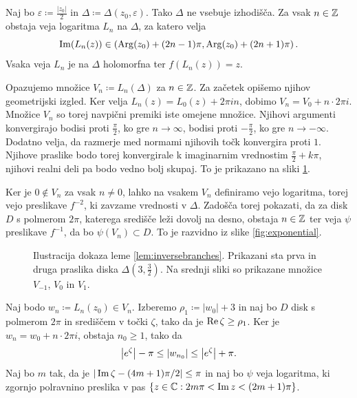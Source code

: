 \begin{dokaz}
    Naj bo \(\varepsilon \coloneq \frac{|z_0|}{2}\) in \(\Delta \coloneq \Delta (z_0, \varepsilon)\). Tako \(\Delta\) ne vsebuje izhodišča. Za vsak \(n \in \mathbb Z\) obstaja veja logaritma \(L_n\) na \(\Delta\), za katero velja
    \[\operatorname{Im} (L_n (z)) \in \left( \operatorname{Arg} (z_0) + (2 n - 1) \pi, \operatorname{Arg} (z_0) + (2 n + 1) \pi \right).\]
    Vsaka veja \(L_n\) je na \(\Delta\) holomorfna ter \(f (L_n (z)) = z\).

    Opazujemo množice \(V_n \coloneq L_n (\Delta)\) za \(n \in \mathbb Z\). Za začetek opišemo njihov geometrijski izgled. Ker velja \(L_n (z) = L_0 (z) + 2 \pi i n\), dobimo \(V_n = V_0 + n \cdot 2 \pi i\). Množice \(V_n\) so torej navpični premiki iste omejene množice. Njihovi argumenti konvergirajo bodisi proti \(\frac{\pi}{2}\), ko gre \(n \to \infty\), bodisi proti \(- \frac{\pi}{2}\), ko gre \(n \to - \infty\). Dodatno velja, da razmerje med normami njihovih točk konvergira proti \(1\). Njihove praslike bodo torej konvergirale k imaginarnim vrednostim \(\frac{\pi}{2} + k \pi\), njihovi realni deli pa bodo vedno bolj skupaj. To je prikazano na sliki \ref{fig:preimages}.

    Ker je \(0 \notin V_n\) za vsak \(n \neq 0\), lahko na vsakem \(V_n\) definiramo vejo logaritma, torej vejo preslikave \(f^{-2}\), ki zavzame vrednosti v \(\Delta\). Zadošča torej pokazati, da za disk \(D\) s polmerom \(2 \pi\), katerega središče leži dovolj na desno, obstaja \(n \in \mathbb Z\) ter veja \(\psi\) preslikave \(f^{- 1}\), da bo \(\psi (V_n) \subset D\). To je razvidno iz slike \ref{fig:exponential}.
    \begin{figure}
        \centering
        
        \caption[]{Ilustracija dokaza leme \ref{lem:inversebranches}. Prikazani sta prva in druga praslika diska \(\Delta (3, \frac{3}{2})\). Na srednji sliki so prikazane množice \(V_{-1}\), \(V_0\) in \(V_1\).}
        \label{fig:preimages}
    \end{figure}

    Naj bodo \(w_n \coloneq L_n (z_0) \in V_n\). Izberemo \(\rho_1 \coloneq |w_0| + 3\) in naj bo \(D\) disk s polmerom \(2 \pi\) in središčem v točki \(\zeta\), tako da je \(\operatorname{Re} \zeta \geq \rho_1\). Ker je \(w_n = w_0 + n \cdot 2 \pi i\), obstaja \(n_0 \geq 1\), tako da
    \begin{equation} \label{eqn:zest}
        \left\lvert e^{\zeta}\right\rvert - \pi \leq \left\lvert w_{n_0}\right\rvert \leq \left\lvert e^{\zeta}\right\rvert + \pi.
    \end{equation}
    Naj bo \(m\) tak, da je \(|\operatorname{Im} \zeta - (4 m + 1) \pi / 2| \leq \pi\) in naj bo \(\psi\) veja logaritma, ki zgornjo polravnino preslika v pas \(\left\{ z \in \mathbb C : 2 m \pi < \operatorname{Im} z < (2 m + 1) \pi \right\}\).


\end{dokaz}
